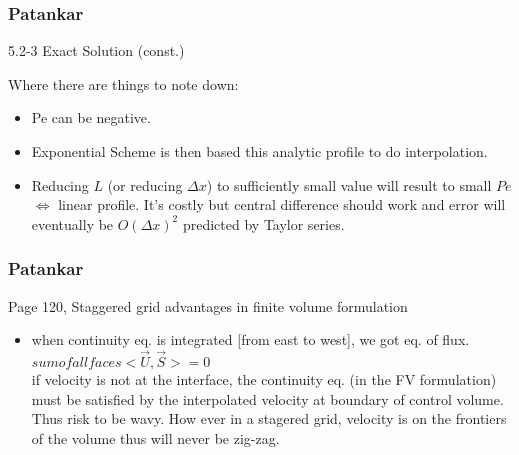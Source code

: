 \documentclass{beamer}
\begin{document}
\begin{frame}
\frametitle{Patankar}
\begin{block}{5.2-3 Exact Solution (const.)}

Where there are things to note down: \\
\begin{itemize}
	\item Pe can be negative.
	\item Exponential Scheme is then based this analytic profile to do interpolation.
	\item Reducing $L$ (or reducing $\Delta x$) to sufficiently small value will result to small $Pe$ $\iff$ linear profile. It's costly but central difference should work and error will eventually be $O(\Delta x)^2$ predicted by Taylor series.
\end{itemize}
\end{block}
\end{frame}
\begin{frame}
\frametitle{Patankar}

\begin{block}{Page 120, Staggered grid advantages in finite volume formulation}
\begin{itemize}
\item when continuity eq. is integrated [from east to west], we got eq. of flux. $ sum of all faces <\vec{U}, \vec{S}>=0  $ \\

if velocity is not at the interface, the continuity eq. (in the FV formulation) must be satisfied by the interpolated velocity at boundary of control volume. Thus risk to be wavy. How ever in a stagered grid, velocity is on the frontiers of the volume thus will never be zig-zag. \\




\end{itemize}
\end{block}

\end{frame}
\end{document}
